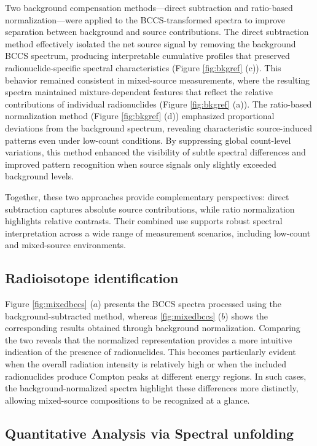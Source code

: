 \documentclass[10pt]{wlscirep}
\begin{document}
Two background compensation methods—direct subtraction and ratio-based normalization—were applied to the BCCS-transformed spectra to improve separation between background and source contributions. The direct subtraction method effectively isolated the net source signal by removing the background BCCS spectrum, producing interpretable cumulative profiles that preserved radionuclide-specific spectral characteristics (Figure \ref{fig:bkgref} (c)). This behavior remained consistent in mixed-source measurements, where the resulting spectra maintained mixture-dependent features that reflect the relative contributions of individual radionuclides (Figure \ref{fig:bkgref} (a)).
The ratio-based normalization method (Figure \ref{fig:bkgref} (d)) emphasized proportional deviations from the background spectrum, revealing characteristic source-induced patterns even under low-count conditions. By suppressing global count-level variations, this method enhanced the visibility of subtle spectral differences and improved pattern recognition when source signals only slightly exceeded background levels.

Together, these two approaches provide complementary perspectives: direct subtraction captures absolute source contributions, while ratio normalization highlights relative contrasts. Their combined use supports robust spectral interpretation across a wide range of measurement scenarios, including low-count and mixed-source environments.

\subsection*{Radioisotope identification}

Figure \ref{fig:mixedbccs} ($a$) presents the BCCS spectra processed using the background-subtracted method, whereas \ref{fig:mixedbccs} ($b$) shows the corresponding results obtained through background normalization. Comparing the two reveals that the normalized representation provides a more intuitive indication of the presence of radionuclides. This becomes particularly evident when the overall radiation intensity is relatively high or when the included radionuclides produce Compton peaks at different energy regions. In such cases, the background-normalized spectra highlight these differences more distinctly, allowing mixed-source compositions to be recognized at a glance.



\subsection*{Quantitative Analysis via Spectral unfolding}
\end{document}
